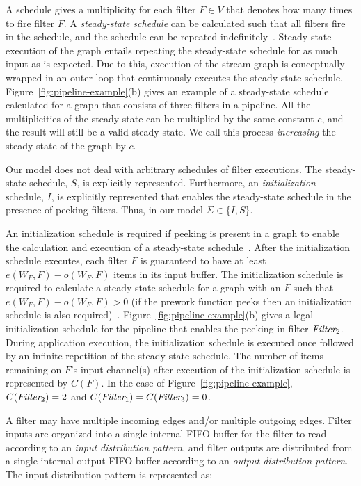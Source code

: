 A schedule gives a multiplicity for each filter $F \in V$ that denotes
how many times to fire filter $F$. A {\it steady-state schedule} can
be calculated such that all filters fire in the schedule, and the
schedule can be repeated indefinitely~\cite{lee87}.  Steady-state
execution of the graph entails repeating the steady-state schedule for
as much input as is expected.  Due to this, execution of the stream
graph is conceptually wrapped in an outer loop that continuously
executes the steady-state schedule.
Figure~\ref{fig:pipeline-example}(b) gives an example of a
steady-state schedule calculated for a graph that consists of three
filters in a pipeline.  All the multiplicities of the steady-state can
be multiplied by the same constant $c$, and the result will still be a
valid steady-state.  We call this process {\it increasing} the
steady-state of the graph by $c$.

Our model does not deal with arbitrary schedules of filter executions.
The steady-state schedule, $S$, is explicitly represented.
Furthermore, an {\it initialization} schedule, $I$, is explicitly
represented that enables the steady-state schedule in the presence of
peeking filters.  Thus, in our model $\Sigma \in \{I, S\}$. 

An initialization schedule is required if peeking is present in a
graph to enable the calculation and execution of a steady-state
schedule~\cite{karczma-thesis}.  After the initialization schedule
executes, each filter $F$ is guaranteed to have at least $e(W_F, F) -
o(W_F, F)$ items in its input buffer. The initialization schedule is
required to calculate a steady-state schedule for a graph with an $F$
such that $e(W_F, F) - o(W_F, F) > 0$ (if the prework function peeks
then an initialization schedule is also
required)~\cite{karczmarek-lctes03}.
Figure~\ref{fig:pipeline-example}(b) gives a legal initialization
schedule for the pipeline that enables the peeking in filter
$\mbox{\it Filter}_2$.  During application execution, the initialization
schedule is executed once followed by an infinite repetition of the
steady-state schedule.   The number
of items remaining on $F$'s input channel(s) after execution of the
initialization schedule is represented by $C(F)$.  In the case of
Figure~\ref{fig:pipeline-example}, $C(\mbox{\it Filter}_2) = 2$ and
$C(\mbox{\it Filter}_1) = C(\mbox{\it Filter}_3) = 0$.

A filter may have multiple incoming edges and/or multiple outgoing
edges.  Filter inputs are organized into a single internal FIFO buffer for the
filter to read according to an {\it input distribution pattern}, and
filter outputs are distributed from a single internal output FIFO
buffer according to an {\it output distribution pattern}.   
The input distribution pattern is represented as:


